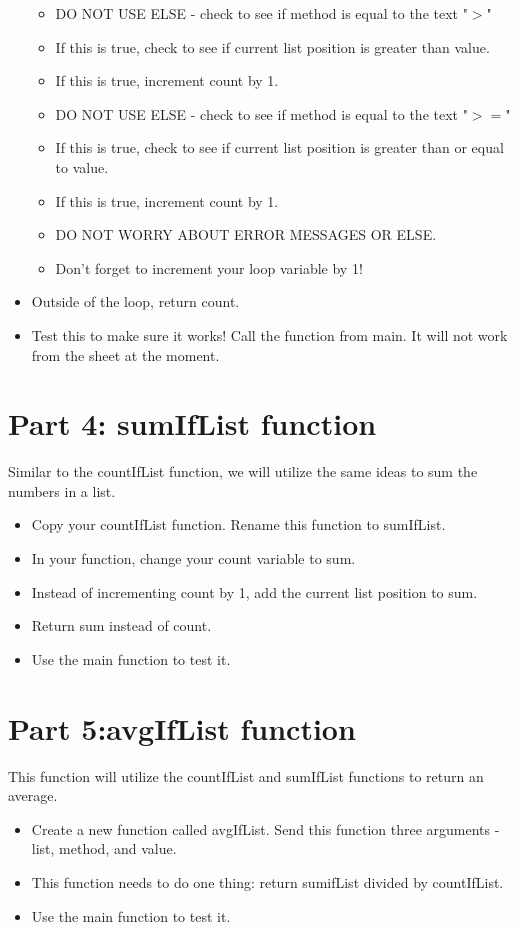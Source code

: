 \documentclass{article}
\begin{document}
\begin{itemize}
\begin{itemize}
    		\item DO NOT USE ELSE - check to see if method is equal to the text "$>$"
    		\item If this is true, check to see if current list position is greater than value.
    		\item If this is true, increment count by 1.
    		\item DO NOT USE ELSE - check to see if method is equal to the text "$>=$"
    		\item If this is true, check to see if current list position is greater than or equal to value.
    		\item If this is true, increment count by 1.
    		\item DO NOT WORRY ABOUT ERROR MESSAGES OR ELSE.
    		\item Don't forget to increment your loop variable by 1!
    	\end{itemize}
    	\item Outside of the loop, return count.
    	\item Test this to make sure it works!  Call the function from main.  It will not work from the sheet at the moment.
\end{itemize}

\section*{Part 4: sumIfList function}
Similar to the countIfList function, we will utilize the same ideas to sum the numbers in a list.
\begin{itemize}
    \item Copy your countIfList function.  Rename this function to sumIfList.
    \item In your function, change your count variable to sum.
    \item Instead of incrementing count by 1, add the current list position to sum.
    \item Return sum instead of count.
    \item Use the main function to test it.
\end{itemize}

\section*{Part 5:avgIfList function}
This function will utilize the countIfList and sumIfList functions to return an average.
\begin{itemize}
    \item Create a new function called avgIfList.  Send this function three arguments - list, method, and value.
    \item This function needs to do one thing:  return sumifList divided by countIfList.
    \item Use the main function to test it.
\end{itemize}
\end{document}
